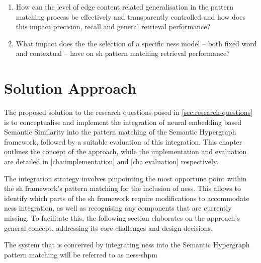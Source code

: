 \documentclass[11pt]{scrreprt}
\begin{document}
\begin{enumerate}[label=\textbf{R.\arabic*}, leftmargin=0pt, labelwidth=*, align=left, labelsep=0.5em, itemindent=0pt, listparindent=\parindent]
    \item How can the level of edge content related generalisation in the pattern matching process be effectively and transparently controlled and how does this impact precision, recall and general retrieval performance?

    \item What impact does the the selection of a specific \gls{ness} model -- both fixed word and contextual -- have on \gls{sh} pattern matching retrieval performance?
\end{enumerate}


\chapter{Solution Approach}
\label{cha:solution-approach}
The proposed solution to the research questions posed in \cref{sec:research-questions} is to conceptualise and implement the integration of neural embedding based Semantic Similarity into the pattern matching of the Semantic Hypergraph framework, followed by a suitable evaluation of this integration. This chapter outlines the concept of the approach, while the implementation and evaluation are detailed in \cref{cha:implementation} and \cref{cha:evaluation} respectively.

The integration strategy involves pinpointing the most opportune point within the \gls{sh} framework's pattern matching for the inclusion of \gls{ness}. This  allows to identify which parts of the \gls{sh} framework require modifications to accommodate \gls{ness} integration, as well as recognising any components that are currently missing. To facilitate this, the following section elaborates on the approach's general concept, addressing its core challenges and design decisions. 

The system that is conceived by integrating \gls{ness} into the Semantic Hypergraph pattern matching will be  referred to as \gls{ness-shpm}
\end{document}
